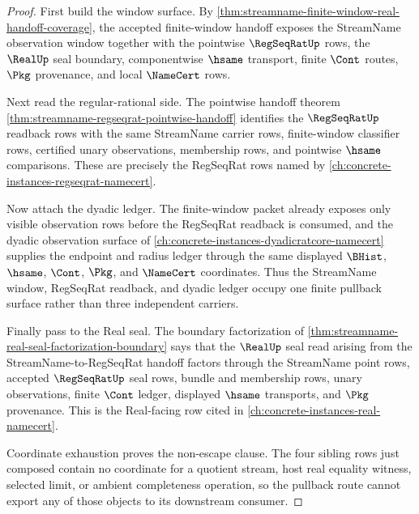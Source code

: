 \begin{proof}
First build the window surface. By \autoref{thm:streamname-finite-window-real-handoff-coverage}, the accepted finite-window handoff exposes the StreamName observation window together with the pointwise $\RegSeqRatUp$ rows, the $\RealUp$ seal boundary, componentwise $\hsame$ transport, finite $\Cont$ routes, $\Pkg$ provenance, and local $\NameCert$ rows.

Next read the regular-rational side. The pointwise handoff theorem \autoref{thm:streamname-regseqrat-pointwise-handoff} identifies the $\RegSeqRatUp$ readback rows with the same StreamName carrier rows, finite-window classifier rows, certified unary observations, membership rows, and pointwise $\hsame$ comparisons. These are precisely the RegSeqRat rows named by \autoref{ch:concrete-instances-regseqrat-namecert}.

Now attach the dyadic ledger. The finite-window packet already exposes only visible observation rows before the RegSeqRat readback is consumed, and the dyadic observation surface of \autoref{ch:concrete-instances-dyadicratcore-namecert} supplies the endpoint and radius ledger through the same displayed $\BHist$, $\hsame$, $\Cont$, $\Pkg$, and $\NameCert$ coordinates. Thus the StreamName window, RegSeqRat readback, and dyadic ledger occupy one finite pullback surface rather than three independent carriers.

Finally pass to the Real seal. The boundary factorization of \autoref{thm:streamname-real-seal-factorization-boundary} says that the $\RealUp$ seal read arising from the StreamName-to-RegSeqRat handoff factors through the StreamName point rows, accepted $\RegSeqRatUp$ seal rows, bundle and membership rows, unary observations, finite $\Cont$ ledger, displayed $\hsame$ transports, and $\Pkg$ provenance. This is the Real-facing row cited in \autoref{ch:concrete-instances-real-namecert}.

Coordinate exhaustion proves the non-escape clause. The four sibling rows just composed contain no coordinate for a quotient stream, host real equality witness, selected limit, or ambient completeness operation, so the pullback route cannot export any of those objects to its downstream consumer.
\end{proof}

